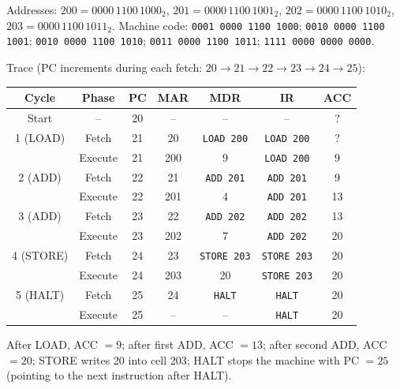 \documentclass[11pt]{article}
\begin{document}
\begin{corrige}[Exercise 1]
Addresses: $200 = 0000\,1100\,1000_2$, $201 = 0000\,1100\,1001_2$, $202 = 0000\,1100\,1010_2$, $203 = 0000\,1100\,1011_2$.
Machine code: \texttt{0001 0000 1100 1000}; \texttt{0010 0000 1100 1001}; \texttt{0010 0000 1100 1010}; \texttt{0011 0000 1100 1011}; \texttt{1111 0000 0000 0000}.

Trace (PC increments during each fetch: $20\to21\to22\to23\to24\to25$):

\begin{center}
\begin{tabular}{|c|c|c|c|c|c|c|}
\hline
\rowcolor{popblueL} \textbf{Cycle} & \textbf{Phase} & \textbf{PC} & \textbf{MAR} & \textbf{MDR} & \textbf{IR} & \textbf{ACC} \\
\hline
Start & -- & 20 & -- & -- & -- & ? \\
\hline
1 (LOAD) & Fetch & 21 & 20 & \texttt{LOAD 200} & \texttt{LOAD 200} & ? \\
  & Execute & 21 & 200 & 9 & \texttt{LOAD 200} & 9 \\
\hline
2 (ADD) & Fetch & 22 & 21 & \texttt{ADD 201} & \texttt{ADD 201} & 9 \\
  & Execute & 22 & 201 & 4 & \texttt{ADD 201} & 13 \\
\hline
3 (ADD) & Fetch & 23 & 22 & \texttt{ADD 202} & \texttt{ADD 202} & 13 \\
  & Execute & 23 & 202 & 7 & \texttt{ADD 202} & 20 \\
\hline
4 (STORE) & Fetch & 24 & 23 & \texttt{STORE 203} & \texttt{STORE 203} & 20 \\
  & Execute & 24 & 203 & 20 & \texttt{STORE 203} & 20 \\
\hline
5 (HALT) & Fetch & 25 & 24 & \texttt{HALT} & \texttt{HALT} & 20 \\
  & Execute & 25 & -- & -- & \texttt{HALT} & 20 \\
\hline
\end{tabular}
\end{center}

After LOAD, ACC $=9$; after first ADD, ACC $=13$; after second ADD, ACC $=20$; STORE writes 20 into cell 203; HALT stops the machine with PC $=25$ (pointing to the next instruction after HALT).
\end{corrige}
\end{document}
